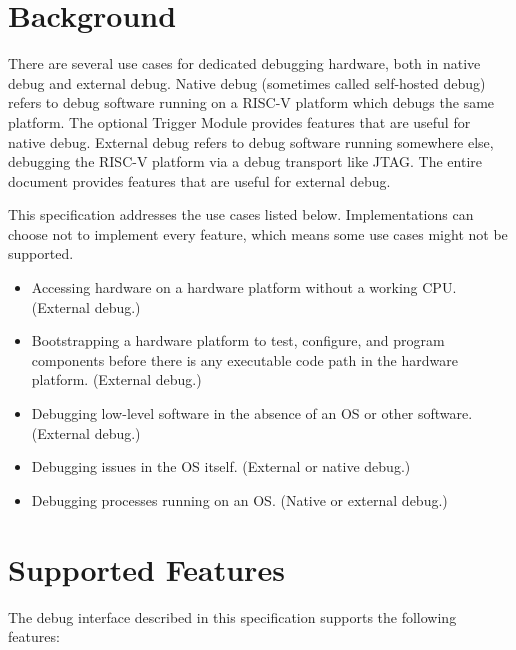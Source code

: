 %

\section{Background}

There are several use cases for dedicated debugging hardware, both in native
debug and external debug. Native debug (sometimes called self-hosted debug)
refers to debug software running on a RISC-V platform which debugs the same
platform.  The optional Trigger Module provides features that are useful for
native debug.  External debug refers to debug software running somewhere else,
debugging the RISC-V platform via a debug transport like JTAG. The entire
document provides features that are useful for external debug.

This specification addresses the use cases listed below. Implementations
can choose not to implement every feature, which means some use cases might
not be supported.

\begin{itemize}
\item Accessing hardware on a hardware platform without a working CPU. (External
debug.)
\item Bootstrapping a hardware platform to test, configure, and program
components before there is any executable code path in the hardware platform.
(External debug.)
\item Debugging low-level software in the absence of an OS or other software.
(External debug.)
\item Debugging issues in the OS itself. (External or native debug.)
\item Debugging processes running on an OS. (Native or external debug.)
\end{itemize}

\section{Supported Features}

The debug interface described in this specification supports the following features:

